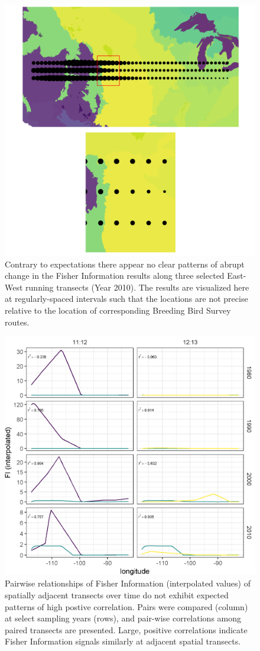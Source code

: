 \documentclass[print]{nuthesis}
\begin{document}
\begin{figure}
\includegraphics[width=0.85\linewidth]{./chapterFiles/fisherSpatial/figures/figsCalledInDiss/scaledFiInterpolated_year2010_zoom_East-West} \caption{Contrary to expectations there appear no clear patterns of abrupt change in the Fisher Information results along three selected East-West running transects  (Year 2010). The results are visualized here at regularly-spaced intervals such that the locations are not precise relative to the location of corresponding Breeding Bird Survey routes.}\label{fig:fiEcoregion}
\end{figure}
\begin{figure}
\includegraphics[width=0.85\linewidth]{./chapterFiles/fisherSpatial/figures/figsCalledInDiss/interpolated_FI_corplotSelectTransects_East-West} \caption{Pairwise relationships of Fisher Information (interpolated values) of spatially adjacent transects over time do not exhibit expected patterns of high postive correlation. Pairs were compared (column) at select sampling years (rows), and pair-wise correlations among paired transects are presented. Large, positive correlations indicate Fisher Information signals similarly at adjacent spatial transects.}\label{fig:corPlotTsectsInterp}
\end{figure}
\end{document}
